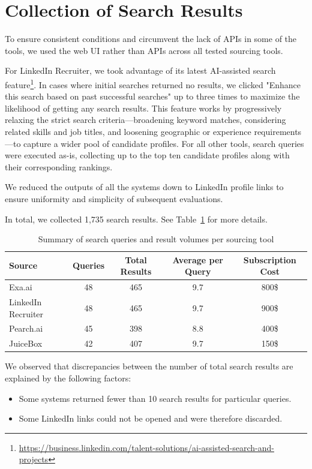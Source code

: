 \documentclass{article}
\begin{document}
\section{Collection of Search Results}

To ensure consistent conditions and circumvent the lack of APIs in some of the tools, we used the web UI rather than APIs across all tested sourcing tools.

For LinkedIn Recruiter, we took advantage of its latest AI-assisted search feature\footnote{\url{https://business.linkedin.com/talent-solutions/ai-assisted-search-and-projects}}. In cases where initial searches returned no results, we clicked "Enhance this search based on past successful searches" up to three times to maximize the likelihood of getting any search results. This feature works by progressively relaxing the strict search criteria—broadening keyword matches, considering related skills and job titles, and loosening geographic or experience requirements—to capture a wider pool of candidate profiles.  For all other tools, search queries were executed as-is, collecting up to the top ten candidate profiles along with their corresponding rankings.

We reduced the outputs of all the systems down to LinkedIn profile links to ensure uniformity and simplicity of subsequent evaluations.

In total, we collected 1,735 search results. See Table~\ref{tab:results-summary} for more details.

\begin{table}[h!]
\centering
\begin{tabular}{|l|c|c|c|c|}
\hline
\textbf{Source} & \textbf{Queries} & \textbf{Total Results} & \textbf{Average per Query} & \textbf{Subscription Cost} \\
\hline
Exa.ai       & 48 & 465 & 9.7 & 800\$ \\
\hline
LinkedIn Recruiter     & 48 & 465 & 9.7 & 900\$\\
\hline
Pearch.ai    & 45 & 398 & 8.8 & 400\$ \\
\hline
JuiceBox    & 42 & 407 & 9.7 & 150\$ \\
\hline
\end{tabular}
\caption{Summary of search queries and result volumes per sourcing tool}
\label{tab:results-summary}
\end{table}


We observed that discrepancies between the number of total search results are explained by the following factors:
\begin{itemize}
    \item Some systems returned fewer than 10 search results for particular queries.
    \item Some LinkedIn links could not be opened and were therefore discarded.
\end{itemize}
\end{document}
